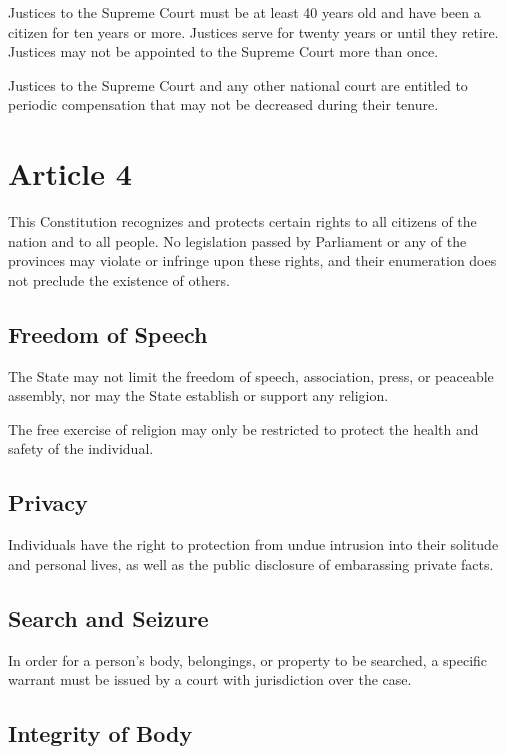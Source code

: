 \documentclass{report}
\begin{document}
    Justices to the Supreme Court must be at least 40 years old and have been a
    citizen for ten years or more. Justices serve for twenty years or until they
    retire. Justices may not be appointed to the Supreme Court more than once.

    Justices to the Supreme Court and any other national court are entitled to
    periodic compensation that may not be decreased during their tenure.

    \section{Article 4}

    This Constitution recognizes and protects certain rights to all citizens of
    the nation and to all people. No legislation passed by Parliament or any of
    the provinces may violate or infringe upon these rights, and their
    enumeration does not preclude the existence of others.

    \subsection{Freedom of Speech}

    The State may not limit the freedom of speech, association, press, or
    peaceable assembly, nor may the State establish or support any religion.

    The free exercise of religion may only be restricted to protect the health
    and safety of the individual.

    \subsection{Privacy}

    Individuals have the right to protection from undue intrusion into their solitude
    and personal lives, as well as the public disclosure of embarassing private facts.

    \subsection{Search and Seizure}

    In order for a person's body, belongings, or property to be searched, a
    specific warrant must be issued by a court with jurisdiction over the case.

    \subsection{Integrity of Body}
\end{document}
